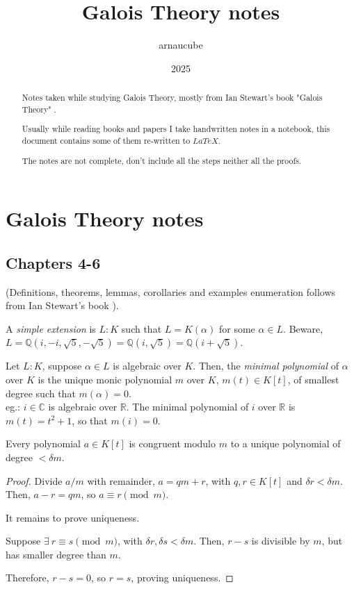 \documentclass{article}
\title{Galois Theory notes}
\author{arnaucube}
\date{2025}
\theoremstyle{definition}
\newenvironment{defn}[1]
{\renewcommand\theinnerdefn{#1}\innerdefn}
{\endinnerdefn}
\newenvironment{lemma}[1]
{\renewcommand\theinnerlemma{#1}\innerlemma}
{\endinnerlemma}
\newenvironment{eg}[1]
{\renewcommand\theinnereg{#1}\innereg}
{\endinnereg}
\begin{document}
\maketitle

\begin{abstract}
	Notes taken while studying Galois Theory, mostly from Ian Stewart's book "Galois Theory" \cite{ianstewart}.

	Usually while reading books and papers I take handwritten notes in a notebook, this document contains some of them re-written to $LaTeX$.

	The notes are not complete, don't include all the steps neither all the proofs.
\end{abstract}

\tableofcontents

\section{Galois Theory notes}
\subsection{Chapters 4-6}
(Definitions, theorems, lemmas, corollaries and examples enumeration follows from Ian Stewart's book \cite{ianstewart}).

\begin{defn}{4.10}
  A \emph{simple extension} is $L:K$ such that $L=K(\alpha)$ for some $\alpha \in L$.
\end{defn}
\begin{eg}{4.11}
  Beware, $L=\mathbb{Q}(i, -i, \sqrt{5}, -\sqrt{5}) = \mathbb{Q}(i, \sqrt{5}) = \mathbb{Q}(i+\sqrt{5})$.
\end{eg}

\begin{defn}{5.5}
  Let $L:K$, suppose $\alpha \in L$ is algebraic over $K$. Then, the \emph{minimal polynomial} of $\alpha$ over $K$ is the unique monic polynomial $m$ over $K$, $m(t) \in K[t]$, of smallest degree such that $m(\alpha)=0$.
  \\
  eg.: $i \in \mathbb{C}$ is algebraic over $\mathbb{R}$. The minimal polynomial of $i$ over $\mathbb{R}$ is $m(t)=t^2 +1$, so that $m(i)=0$.
\end{defn}

\begin{lemma}{5.9}
  Every polynomial $a \in K[t]$ is congruent modulo $m$ to a unique polynomial of degree $< \delta m$.
\end{lemma}
\begin{proof}
  Divide $a / m$ with remainder, $a= qm +r$, with $q,r \in K[t]$ and $\delta r < \delta m$.
  Then, $a-r=qm$, so $a \equiv r \pmod{m}$.

  It remains to prove uniqueness.

  Suppose $\exists~ r \equiv s \pmod{m}$, with $\delta r, \delta s < \delta m$.
  Then, $r-s$ is divisible by $m$, but has smaller degree than $m$.

  Therefore, $r-s=0$, so $r=s$, proving uniqueness.
\end{proof}
\end{document}

